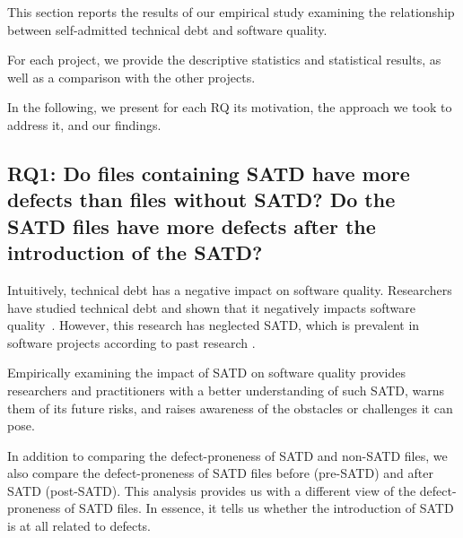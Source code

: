 This section reports the results of our empirical study examining the relationship between self-admitted technical debt and software quality. 

For each project, we provide the descriptive statistics and statistical results, as well as a comparison with the other projects. 



In the following, we present for each RQ its motivation, the approach we took to address it, and our findings.


\subsection*{RQ1: Do files containing SATD have more defects than files without SATD? Do the SATD files have more defects after the introduction of the SATD?}

 Intuitively, technical debt has a negative impact on software quality. Researchers have studied technical debt and shown that it negatively impacts software quality~\cite{zazworka2011investigating}. However, this research has neglected SATD, which is prevalent in software projects according to past research \cite{ICSM_PotdarS14}.

Empirically examining the impact of SATD on software quality provides researchers and practitioners with a better understanding of such SATD, warns them of its future risks, and raises awareness of the obstacles or challenges it can pose.

In addition to comparing the defect-proneness of SATD and non-SATD files, we also compare the defect-proneness of SATD files before (pre-SATD) and after SATD (post-SATD). This analysis provides us with a different view of the defect-proneness of SATD files. In essence, it tells us whether the introduction of SATD is at all related to defects.



